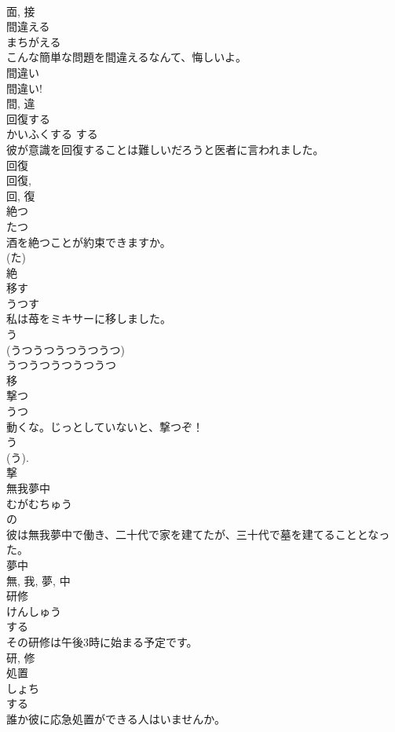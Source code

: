 \documentclass[8pt]{extreport}
\begin{document}
\begin{CJK}{UTF8}{min}
\\	面, 接	
\\	間違える	
\\	まちがえる	
\\	こんな簡単な問題を間違えるなんて、悔しいよ。	
\\	間違い 
\\	間違い! 
\\	間, 違	
\\	回復する	
\\	かいふくする	する 
\\	彼が意識を回復することは難しいだろうと医者に言われました。	
\\	回復 
\\	回復, 
\\	回, 復	
\\	絶つ	
\\	たつ	
\\	酒を絶つことが約束できますか。	
\\	(た) 
\\	絶	
\\	移す	
\\	うつす	
\\	私は苺をミキサーに移しました。	
\\	う 
\\	(うつうつうつうつうつ) 
\\	うつうつうつうつうつ
\\	移	
\\	撃つ	
\\	うつ	
\\	動くな。じっとしていないと、撃つぞ！	
\\	う 
\\	(う). 
\\	撃	
\\	無我夢中	
\\	むがむちゅう	
\\	の 
\\	彼は無我夢中で働き、二十代で家を建てたが、三十代で墓を建てることとなった。	
\\	夢中 
\\	無, 我, 夢, 中	
\\	研修	
\\	けんしゅう	
\\	する 
\\	その研修は午後3時に始まる予定です。	
\\	研, 修	
\\	処置	
\\	しょち	
\\	する 
\\	誰か彼に応急処置ができる人はいませんか。	

\end{CJK}
\end{document}
